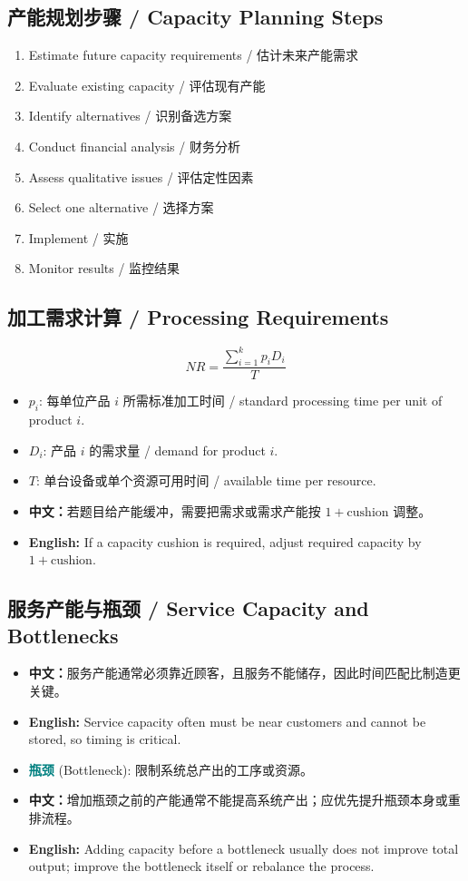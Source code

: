 \documentclass[11pt,a4paper]{ctexart}
\newcommand{\term}[2]{\textbf{\textcolor{Teal}{#1}} \textcolor{Muted}{(#2)}}
\newcommand{\cn}[1]{\textbf{中文：}#1}
\newcommand{\en}[1]{\textbf{English:} #1}
\begin{document}
\subsection{产能规划步骤 / Capacity Planning Steps}
\begin{enumerate}
  \item Estimate future capacity requirements / 估计未来产能需求
  \item Evaluate existing capacity / 评估现有产能
  \item Identify alternatives / 识别备选方案
  \item Conduct financial analysis / 财务分析
  \item Assess qualitative issues / 评估定性因素
  \item Select one alternative / 选择方案
  \item Implement / 实施
  \item Monitor results / 监控结果
\end{enumerate}

\subsection{加工需求计算 / Processing Requirements}
\[
NR=\frac{\sum_{i=1}^{k}p_iD_i}{T}
\]
\begin{itemize}
  \item $p_i$: 每单位产品 $i$ 所需标准加工时间 / standard processing time per unit of product $i$.
  \item $D_i$: 产品 $i$ 的需求量 / demand for product $i$.
  \item $T$: 单台设备或单个资源可用时间 / available time per resource.
  \item \cn{若题目给产能缓冲，需要把需求或需求产能按 $1+\text{cushion}$ 调整。}
  \item \en{If a capacity cushion is required, adjust required capacity by $1+\text{cushion}$.}
\end{itemize}

\subsection{服务产能与瓶颈 / Service Capacity and Bottlenecks}
\begin{itemize}
  \item \cn{服务产能通常必须靠近顾客，且服务不能储存，因此时间匹配比制造更关键。}
  \item \en{Service capacity often must be near customers and cannot be stored, so timing is critical.}
  \item \term{瓶颈}{Bottleneck}: 限制系统总产出的工序或资源。
  \item \cn{增加瓶颈之前的产能通常不能提高系统产出；应优先提升瓶颈本身或重排流程。}
  \item \en{Adding capacity before a bottleneck usually does not improve total output; improve the bottleneck itself or rebalance the process.}
\end{itemize}
\end{document}
